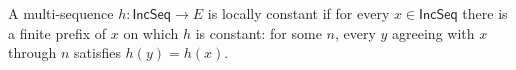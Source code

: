 \begin{definition}
A multi-sequence $h:\mathsf{IncSeq}\to E$ is locally constant if for every
$x\in\mathsf{IncSeq}$ there is a finite prefix of $x$ on which $h$ is
constant: for some $n$, every $y$ agreeing with $x$ through $n$ satisfies
$h(y)=h(x)$.
\end{definition}
